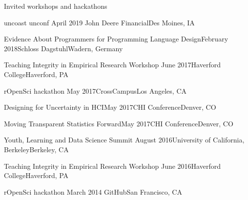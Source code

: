 \documentclass{resume} %
\begin{document}

\begin{rSection}{Invited workshops and hackathons}

\begin{sSubsection}{uncoast unconf}{ }{April 2019}{ John Deere Financial}{Des Moines, IA}
\end{sSubsection}

\begin{sSubsection}{Evidence About Programmers for Programming Language Design}{}{February 2018}{Schloss Dagstuhl}{Wadern, Germany}
\end{sSubsection}

\begin{sSubsection}{Teaching Integrity in Empirical Research Workshop}{ }{June 2017}{Haverford College}{Haverford, PA}
\end{sSubsection}

\begin{sSubsection}{rOpenSci hackathon}{ }{May 2017}{CrossCampus}{Los Angeles, CA}
\end{sSubsection}

\begin{sSubsection}{Designing for Uncertainty in HCI}{}{May 2017}{CHI Conference}{Denver, CO}
\end{sSubsection}

\begin{sSubsection}{Moving Transparent Statistics Forward}{}{May 2017}{CHI Conference}{Denver, CO}
\end{sSubsection}

\begin{sSubsection}{Youth, Learning and Data Science Summit}{ }{August 2016}{University of California, Berkeley}{Berkeley, CA}
\end{sSubsection}

\begin{sSubsection}{Teaching Integrity in Empirical Research Workshop}{ }{June 2016}{Haverford College}{Haverford, PA}
\end{sSubsection}

\begin{sSubsection}{rOpenSci hackathon}{ }{March 2014}{ GitHub}{San Francisco, CA}
\end{sSubsection}


\end{rSection}
\end{document}
